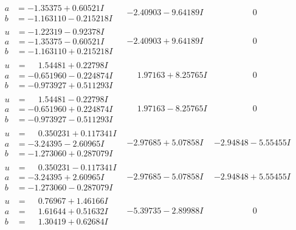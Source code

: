 \documentclass[1p]{elsarticle_modified}
\theoremstyle{definition}
\begin{document}
$$\begin{array}{c|c|c}
\begin{aligned}
a &= -1.35375 + 0.60521 I \\
b &= -1.163110 - 0.215218 I\end{aligned}
 & -2.40903 - 9.64189 I & \phantom{-0.000000 } 0 \\ \hline\begin{aligned}
u &= -1.22319 - 0.92378 I \\
a &= -1.35375 - 0.60521 I \\
b &= -1.163110 + 0.215218 I\end{aligned}
 & -2.40903 + 9.64189 I & \phantom{-0.000000 } 0 \\ \hline\begin{aligned}
u &= \phantom{-}1.54481 + 0.22798 I \\
a &= -0.651960 - 0.224874 I \\
b &= -0.973927 + 0.511293 I\end{aligned}
 & \phantom{-}1.97163 + 8.25765 I & \phantom{-0.000000 } 0 \\ \hline\begin{aligned}
u &= \phantom{-}1.54481 - 0.22798 I \\
a &= -0.651960 + 0.224874 I \\
b &= -0.973927 - 0.511293 I\end{aligned}
 & \phantom{-}1.97163 - 8.25765 I & \phantom{-0.000000 } 0 \\ \hline\begin{aligned}
u &= \phantom{-}0.350231 + 0.117341 I \\
a &= -3.24395 - 2.60965 I \\
b &= -1.273060 + 0.287079 I\end{aligned}
 & -2.97685 + 5.07858 I & -2.94848 - 5.55455 I \\ \hline\begin{aligned}
u &= \phantom{-}0.350231 - 0.117341 I \\
a &= -3.24395 + 2.60965 I \\
b &= -1.273060 - 0.287079 I\end{aligned}
 & -2.97685 - 5.07858 I & -2.94848 + 5.55455 I \\ \hline\begin{aligned}
u &= \phantom{-}0.76967 + 1.46166 I \\
a &= \phantom{-}1.61644 + 0.51632 I \\
b &= \phantom{-}1.30419 + 0.62684 I\end{aligned}
 & -5.39735 - 2.89988 I & \phantom{-0.000000 } 0 \\ \hline\begin{aligned}

\end{aligned}
\end{array}$$
\end{document}
